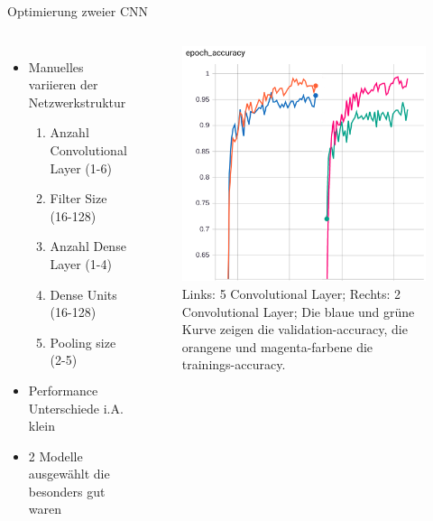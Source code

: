 \documentclass[aspectratio=1610, 9pt]{beamer}
\begin{document}
\begin{frame}{Optimierung zweier CNN}

  \begin{columns}
    \begin{itemize}
    \item Manuelles variieren der Netzwerkstruktur
      \begin{enumerate}
      \item Anzahl Convolutional Layer (1-6)
      \item Filter Size (16-128)
      \item Anzahl Dense Layer (1-4)
      \item Dense Units (16-128)
      \item Pooling size (2-5)
      \end{enumerate}
    \item Performance Unterschiede i.A. klein
    \item 2 Modelle ausgewählt die besonders gut waren
    \end{itemize}

    
    \begin{figure}
      \centering
      \includegraphics[scale=0.35]{images/models.png}      
      \caption{Links: 5 Convolutional Layer; Rechts: 2 Convolutional Layer; Die blaue und grüne Kurve zeigen die validation-accuracy, die orangene und magenta-farbene die trainings-accuracy.}
      \label{fig:acc}
    \end{figure}

  \end{columns}
\end{frame}
\end{document}
